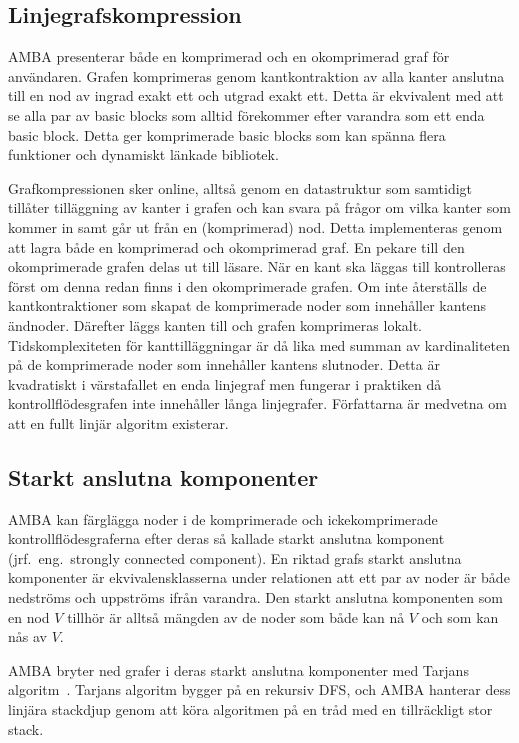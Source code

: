 \subsection{Linjegrafskompression}

AMBA presenterar både en komprimerad och en okomprimerad graf för användaren.
Grafen komprimeras genom kantkontraktion av alla kanter anslutna till en nod av
ingrad exakt ett och utgrad exakt ett. Detta är ekvivalent med att se alla par
av basic blocks som alltid förekommer efter varandra som ett enda basic block.
Detta ger komprimerade basic blocks som kan spänna flera funktioner och dynamiskt
länkade bibliotek.

Grafkompressionen sker online, alltså genom en datastruktur som samtidigt
tillåter tilläggning av kanter i grafen och kan svara på frågor om vilka kanter
som kommer in samt går ut från en (komprimerad) nod. Detta implementeras genom
att lagra både en komprimerad och okomprimerad graf. En pekare till den
okomprimerade grafen delas ut till läsare. När en kant ska läggas till
kontrolleras först om denna redan finns i den okomprimerade grafen. Om inte
återställs de kantkontraktioner som skapat de komprimerade noder som innehåller
kantens ändnoder. Därefter läggs kanten till och grafen komprimeras lokalt.
Tidskomplexiteten för kanttilläggningar är då lika med summan av kardinaliteten
på de komprimerade noder som innehåller kantens slutnoder. Detta är kvadratiskt
i värstafallet en enda linjegraf men fungerar i praktiken då
kontrollflödesgrafen inte innehåller långa linjegrafer. Författarna är medvetna
om att en fullt linjär algoritm existerar.

\subsection{Starkt anslutna komponenter}

AMBA kan färglägga noder i de komprimerade och ickekomprimerade
kontrollflödesgraferna efter deras så kallade starkt anslutna komponent (jrf.\
eng.\ strongly connected component). En riktad grafs starkt anslutna komponenter
är ekvivalensklasserna under relationen att ett par av noder är både nedströms
och uppströms ifrån varandra. Den starkt anslutna komponenten som en nod $V$
tillhör är alltså mängden av de noder som både kan nå $V$ och som kan nås av
$V$.

AMBA bryter ned grafer i deras starkt anslutna komponenter med Tarjans
algoritm~\cite{tarjan}. Tarjans algoritm bygger på en rekursiv DFS, och AMBA
hanterar dess linjära stackdjup genom att köra algoritmen på en tråd med en
tillräckligt stor stack.


